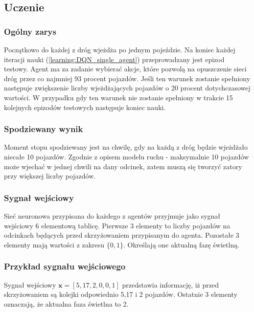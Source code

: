 \documentclass[12pt]{book}
\theoremstyle{plain}
\newcommand{\myref}[1]{(\ref{#1})}
\begin{document}
\subsection{Uczenie}
\subsubsection{Ogólny zarys}
Początkowo do każdej z dróg wjeżdża po jednym pojeździe. Na koniec każdej iteracji nauki \myref{learning:DQN_single_agent} przeprowadzany jest epizod testowy. Agent ma za zadanie wybierać akcje, które pozwolą na opuszczenie sieci dróg przez co najmniej 93 procent pojazdów. Jeśli ten warunek zostanie spełniony następuje zwiększenie liczby wjeżdżających pojazdów o 20 procent dotychczasowej wartości. W przypadku gdy ten warunek nie zostanie spełniony w trakcie 15 kolejnych epizodów testowych następuje koniec nauki. 


\subsubsection*{Spodziewany wynik}
Moment stopu spodziewany jest na chwilę, gdy na każdą z dróg będzie wjeżdżało niecałe 10 pojazdów. Zgodnie z opisem modelu ruchu - maksymalnie 10 pojazdów może wjechać w jednej chwili na dany odcinek, zatem muszą się tworzyć zatory przy większej liczby pojazdów.


\subsubsection*{Sygnał wejściowy}
Sieć neuronowa przypisana do każdego z agentów przyjmuje jako sygnał wejściowy 6 elementową tablicę. Pierwsze 3 elementy to liczby pojazdów na odcinkach będących przed skrzyżowaniem przypisanym do agenta. Pozostałe 3 elementy mają wartości z zakresu $\{0,1\}$. Określają one aktualną fazę świetlną. 
\subsubsection*{Przykład sygnału wejściowego}
Sygnał wejściowy $\textbf{x}=[5,17,2,0,0,1]$ przedstawia informację, iż przed skrzyżowaniem są kolejki odpowiednio 5,17 i 2 pojazdów. Ostatnie 3 elementy oznaczają, że aktualna faza świetlna to 2.
\end{document}
